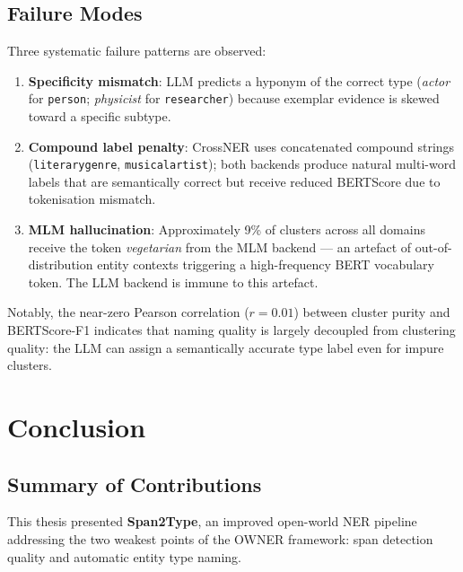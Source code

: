 \documentclass[11pt,a4paper]{article}
\begin{document}
\subsection{Failure Modes}

Three systematic failure patterns are observed:
\begin{enumerate}[noitemsep]
  \item \textbf{Specificity mismatch}: LLM predicts a hyponym of the correct type (\textit{actor} for \texttt{person}; \textit{physicist} for \texttt{researcher}) because exemplar evidence is skewed toward a specific subtype.
  \item \textbf{Compound label penalty}: CrossNER uses concatenated compound strings (\texttt{literarygenre}, \texttt{musicalartist}); both backends produce natural multi-word labels that are semantically correct but receive reduced BERTScore due to tokenisation mismatch.
  \item \textbf{MLM hallucination}: Approximately 9\% of clusters across all domains receive the token \textit{vegetarian} from the MLM backend — an artefact of out-of-distribution entity contexts triggering a high-frequency BERT vocabulary token. The LLM backend is immune to this artefact.
\end{enumerate}

Notably, the near-zero Pearson correlation ($r = 0.01$) between cluster purity and BERTScore-F1 indicates that naming quality is largely decoupled from clustering quality: the LLM can assign a semantically accurate type label even for impure clusters.

\section{Conclusion}

\subsection{Summary of Contributions}

This thesis presented \textbf{Span2Type}, an improved open-world NER pipeline addressing the two weakest points of the OWNER framework: span detection quality and automatic entity type naming.
\end{document}
